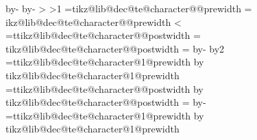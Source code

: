 {        \advance\pgf@y by-\pgf@xa%
        \advance\pgf@y by-\pgf@xb%
        \pgfmathdivide{\the\pgf@x}{\the\pgf@y}%
        \let\tikz@lib@dec@characterwidthscale=\pgfmathresult%
        \pgfmathloop
        \ifnum\pgfmathcounter>\tikz@lib@dec@te@charactertotalcount\relax%
        \else%
        \ifnum\pgfmathcounter>1\relax%
          \pgf@x=\csname tikz@lib@dec@te@character@\pgfmathcounter @prewidth\endcsname\relax%
          \pgf@x=\tikz@lib@dec@characterwidthscale\pgf@x%
            \expandafter\edef\csname tikz@lib@dec@te@character@\pgfmathcounter @prewidth\endcsname{\the\pgf@x}%
          \fi%
          \ifnum\pgfmathcounter<\tikz@lib@dec@te@charactertotalcount\relax%
            \pgf@x=\csname tikz@lib@dec@te@character@\pgfmathcounter @postwidth\endcsname\relax%
            \pgf@x=\tikz@lib@dec@characterwidthscale\pgf@x%
            \expandafter\edef\csname tikz@lib@dec@te@character@\pgfmathcounter @postwidth\endcsname{\the\pgf@x}%
          \fi%
        \repeatpgfmathloop%
        \tikz@lib@dec@te@addwidthstoparameters%
        \let\tikz@lib@dec@te@textwidth=\pgfdecoratedpathlength%
      \else%
        \ifx\tikz@lib@dec@align\tikz@lib@dec@align@center@text%
           \pgf@x=\pgfdecoratedpathlength\relax%
           \advance\pgf@x by-\tikz@lib@dec@te@textwidth\relax%
           \ifdim\pgf@x<0pt\relax%
             \pgf@x=0pt\relax%
           \fi%
           \divide\pgf@x by2\relax%
           \pgf@xa=\csname tikz@lib@dec@te@character@1@prewidth\endcsname\relax%
           \advance\pgf@xa by\pgf@x%
           \expandafter\edef\csname tikz@lib@dec@te@character@1@prewidth\endcsname{\the\pgf@xa}%
           \pgf@xa=\csname tikz@lib@dec@te@character@\tikz@lib@dec@te@charactertotalcount @postwidth\endcsname\relax%
           \advance\pgf@xa by\pgf@x%
           \expandafter\edef\csname tikz@lib@dec@te@character@\tikz@lib@dec@te@charactertotalcount @postwidth\endcsname{\the\pgf@xa}%
        \else%
          \ifx\tikz@lib@dec@align\tikz@lib@dec@align@right@text%
            \pgf@x=\pgfdecoratedpathlength\relax%
            \advance\pgf@x by-\tikz@lib@dec@te@textwidth\relax%
            \ifdim\pgf@x<0pt\relax%
              \pgf@x=0pt\relax%
            \fi%
            \pgf@xa=\csname tikz@lib@dec@te@character@1@prewidth\endcsname\relax%
            \advance\pgf@xa by\pgf@x%
            \expandafter\edef\csname tikz@lib@dec@te@character@1@prewidth\endcsname{\the\pgf@xa}%
          \fi%
        \fi%
        \tikz@lib@dec@te@addwidthstoparameters%
      \fi%
    \fi%
  \fi%
}


